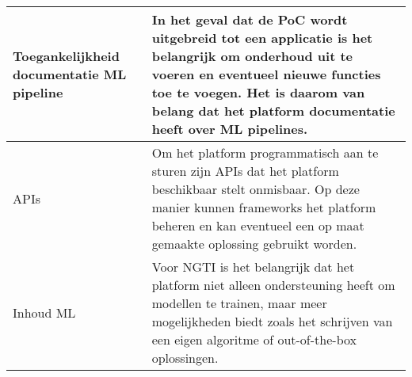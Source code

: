 \begin{table}[hbt!]
\begin{tabular}{|p{.2\linewidth}|p{.69\linewidth}|}
    Toegankelijkheid documentatie ML pipeline
    &
    In het geval dat de PoC wordt uitgebreid tot een applicatie is het belangrijk om onderhoud uit te voeren en eventueel nieuwe functies toe te voegen. Het is daarom van belang dat het platform documentatie heeft over ML pipelines. 
    \\ \hline

    APIs
    &
    Om het platform programmatisch aan te sturen zijn APIs dat het platform beschikbaar stelt onmisbaar. Op deze manier kunnen frameworks het platform beheren en kan eventueel een op maat gemaakte oplossing gebruikt worden.
    \\ \hline

    Inhoud ML
    &
    Voor NGTI is het belangrijk dat het platform niet alleen ondersteuning heeft om modellen te trainen, maar meer mogelijkheden biedt zoals het schrijven van een eigen algoritme of out-of-the-box oplossingen.
    \\ \hline
  \end{tabular}
  \label{table:criteria-cloud-computing-platforms}
\end{table}

\newpage